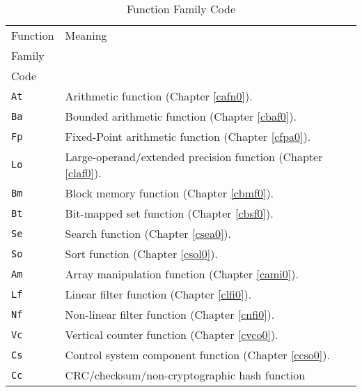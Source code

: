 \begin{table}
\caption{Function Family Code}
\label{tbl:ciov0:slcv0:sfnc0:03}
\begin{center}
\begin{tabular}{|l|l|}
\hline
Function       & Meaning                                                                     \\
Family         &                                                                             \\
Code           &                                                                             \\
\hline
\hline
\texttt{At}    & Arithmetic function (Chapter \ref{cafn0}).                                  \\
\hline
\texttt{Ba}    & Bounded arithmetic function (Chapter \ref{cbaf0}).                          \\
\hline
\texttt{Fp}    & Fixed-Point arithmetic function (Chapter \ref{cfpa0}).                      \\
\hline
\texttt{Lo}    & Large-operand/extended precision function (Chapter \ref{claf0}).            \\
\hline
\texttt{Bm}    & Block memory function (Chapter \ref{cbmf0}).                                \\
\hline
\texttt{Bt}    & Bit-mapped set function (Chapter \ref{cbsf0}).                              \\
\hline
\texttt{Se}    & Search function (Chapter \ref{csea0}).                                      \\
\hline
\texttt{So}    & Sort function (Chapter \ref{csol0}).                                        \\
\hline
\texttt{Am}    & Array manipulation function (Chapter \ref{cami0}).                          \\
\hline
\texttt{Lf}    & Linear filter function (Chapter \ref{clfi0}).                               \\
\hline
\texttt{Nf}    & Non-linear filter function (Chapter \ref{cnfi0}).                           \\
\hline
\texttt{Vc}    & Vertical counter function (Chapter \ref{cvco0}).                            \\
\hline
\texttt{Cs}    & Control system component function (Chapter \ref{ccso0}).                    \\
\hline
\texttt{Cc}    & CRC/checksum/non-cryptographic hash function                                \\

\end{tabular}
\end{center}
\end{table}
